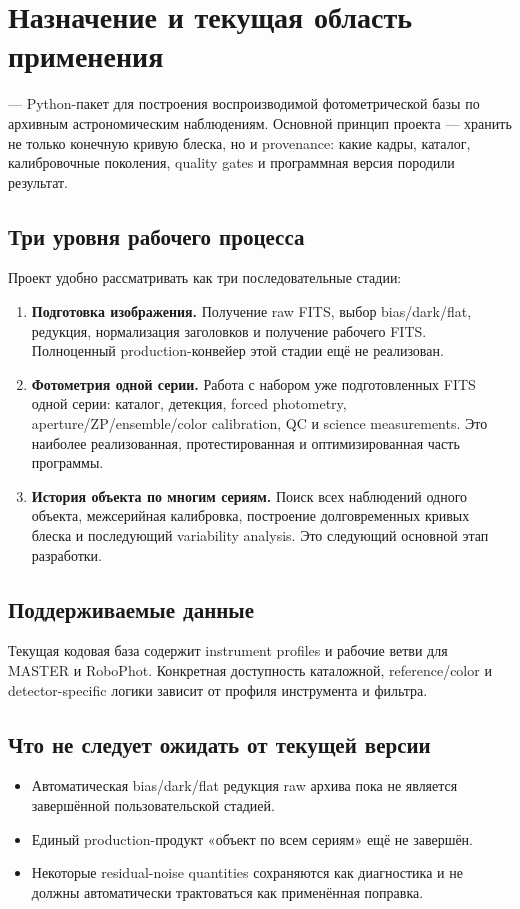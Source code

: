 \chapter{Назначение и текущая область применения}

\program{} --- Python-пакет для построения воспроизводимой фотометрической базы по архивным астрономическим наблюдениям. Основной принцип проекта --- хранить не только конечную кривую блеска, но и provenance: какие кадры, каталог, калибровочные поколения, quality gates и программная версия породили результат.

\section{Три уровня рабочего процесса}

Проект удобно рассматривать как три последовательные стадии:

\begin{enumerate}
  \item \textbf{Подготовка изображения.} Получение raw FITS, выбор bias/dark/flat, редукция, нормализация заголовков и получение рабочего FITS. Полноценный production-конвейер этой стадии ещё не реализован.
  \item \textbf{Фотометрия одной серии.} Работа с набором уже подготовленных FITS одной серии: каталог, детекция, forced photometry, aperture/ZP/ensemble/color calibration, QC и science measurements. Это наиболее реализованная, протестированная и оптимизированная часть программы.
  \item \textbf{История объекта по многим сериям.} Поиск всех наблюдений одного объекта, межсерийная калибровка, построение долговременных кривых блеска и последующий variability analysis. Это следующий основной этап разработки.
\end{enumerate}

\section{Поддерживаемые данные}

Текущая кодовая база содержит instrument profiles и рабочие ветви для MASTER и RoboPhot. Конкретная доступность каталожной, reference/color и detector-specific логики зависит от профиля инструмента и фильтра.

\section{Что не следует ожидать от текущей версии}

\begin{itemize}
  \item Автоматическая bias/dark/flat редукция raw архива пока не является завершённой пользовательской стадией.
  \item Единый production-продукт «объект по всем сериям» ещё не завершён.
  \item Некоторые residual-noise quantities сохраняются как диагностика и не должны автоматически трактоваться как применённая поправка.
\end{itemize}
